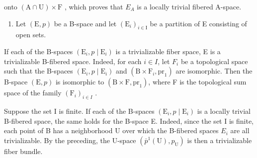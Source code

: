 onto \((\mathrm{A}\cap\mathrm{U})\times\mathrm{F}\) , which proves that \(E_{A}\) is a locally trivial fibered A-space.

\begin{enumerate}
\def\labelenumi{\arabic{enumi})}
\setcounter{enumi}{1}
\tightlist
\item
  Let \((\mathrm{E}, p)\) be a B-space and let \((\mathrm{E}_{i})_{i \in \mathrm{I}}\) be a partition of E consisting of open sets.
\end{enumerate}

If each of the B-spaces \((\mathrm{E}_{i}, p \mid \mathrm{E}_{i})\) is a trivializable fiber space, E is a trivializable B-fibered space. Indeed, for each \(i \in I\), let \(F_{i}\) be a topological space such that the B-spaces \((\mathrm{E}_{i}, p \mid \mathrm{E}_{i})\) and \((\mathrm{B} \times \mathrm{F}_{i}, \mathrm{pr}_{1})\) are isomorphic. Then the B-space \((\mathrm{E}, p)\) is isomorphic to \((\mathrm{B} \times \mathrm{F}, \mathrm{pr}_{1})\), where F is the topological sum space of the family \((\mathrm{F}_{i})_{i \in I}\) .

Suppose the set I is finite. If each of the B-spaces \((\mathrm{E}_{i}, p \mid \mathrm{E}_{i})\) is a locally trivial B-fibered space, the same holds for the B-space E. Indeed, since the set I is finite, each point of B has a neighborhood U over which the B-fibered spaces \(E_{i}\) are all trivializable. By the preceding, the U-space \((\bar{p}^{1}(\mathrm{U}), p_{\mathrm{U}})\) is then a trivializable fiber bundle.

